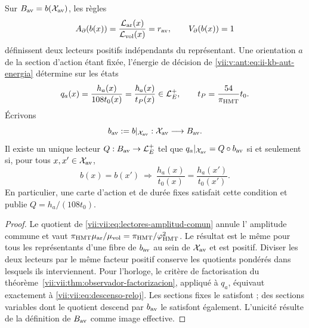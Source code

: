 \begin{proposition}
\label{vii:vii:prop:lectores-frontera-explicitos}
Sur \(B_{\rm av}=b(\mathcal X_{\rm av})\), les règles
\begin{equation}
 A_\partial(b(x))
 =\frac{\mathcal L_{\rm ar}(x)}{\mathcal L_{\rm vol}(x)}
 =r_{\rm av},\qquad V_\partial(b(x))=1
 \label{vii:vii:eq:lectores-normalizados}
\end{equation}
définissent deux lecteurs positifs indépendants du représentant.
Une orientation \(a\) de la section d'action étant fixée, l'énergie de
décision de \eqref{vii:v:ant:eq:ii-kb-aut-energia} détermine sur les états
\begin{equation}
 q_a(x)=\frac{h_a(x)}{108t_0(x)}
       =\frac{\hbar_a(x)}{t_P(x)}\in\mathcal L_E^+,
 \qquad t_P=\frac{54}{\pi_{\rm HMT}}t_0.
 \label{vii:vii:eq:lector-q-accion}
\end{equation}
Écrivons
\[
 b_{\rm av}:=b|_{\mathcal X_{\rm av}}:
 \mathcal X_{\rm av}\longrightarrow B_{\rm av}.
\]
Il existe un unique lecteur \(Q:B_{\rm av}\to\mathcal L_E^+\) tel que
\(q_a|_{\mathcal X_{\rm av}}=Q\circ b_{\rm av}\)
si et seulement si, pour tous \(x,x'\in\mathcal X_{\rm av}\),
\begin{equation}
 b(x)=b(x')\ \Longrightarrow\
 \frac{h_a(x)}{t_0(x)}=\frac{h_a(x')}{t_0(x')}.
 \label{vii:vii:eq:descenso-reloj}
\end{equation}
En particulier, une carte d'action et de durée fixes satisfait cette
condition et publie \(Q=h_a/(108t_0)\).
\end{proposition}
\begin{proof}
Le quotient de \eqref{vii:vii:eq:lectores-amplitud-comun} annule l'
amplitude commune et vaut
\(\pi_{\rm HMT}\mu_{\rm ar}/\mu_{\rm vol}
=\pi_{\rm HMT}/\varphi_{\rm HMT}^2\).
Le résultat est le même pour tous les représentants d'une fibre
de \(b_{\rm av}\) au sein de \(\mathcal X_{\rm av}\) et est positif.
Diviser les deux lecteurs par le même facteur positif
conserve les quotients pondérés dans lesquels ils interviennent.
Pour l'horloge, le critère de factorisation du
théorème~\ref{vii:vii:thm:observador-factorizacion}, appliqué à \(q_a\),
équivaut exactement à \eqref{vii:vii:eq:descenso-reloj}. Les sections
fixes le satisfont ; des sections variables dont le
quotient descend par \(b_{\rm av}\) le satisfont également. L'unicité résulte de la définition
de \(B_{\rm av}\) comme image effective.
\end{proof}

